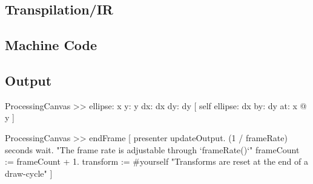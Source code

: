 \subsection{Transpilation/IR}
\subsection{Machine Code}
\subsection{Output}


\begin{code}
ProcessingCanvas >> ellipse: x y: y dx: dx dy: dy [
	self
		ellipse: dx
		by: dy
		at: x @ y
]
\end{code}


\begin{code}
ProcessingCanvas >> endFrame [
	presenter updateOutput.
	(1 / frameRate) seconds wait.	"The frame rate is adjustable through `frameRate()`"
	frameCount := frameCount + 1.
	transform := #yourself	"Transforms are reset at the end of a draw-cycle"
]
\end{code}
